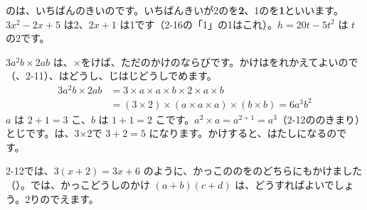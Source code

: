 のは、いちばんのきいのです。いちばんきいが2のを\textbf{2}、1のを\textbf{1}といいます。$3x^2-2x+5$ は2、$2x+1$ は1です（2-16の「1」の1はこれ）。$h=20t-5t^2$ は $t$ の2です。

$3a^2b\times2ab$ は、×をけば、ただのかけのならびです。かけはをれかえてよいので（、2-11）、はどうし、じはじどうしでめます。
\begin{align*}
3a^2b\times2ab&=3\times a\times a\times b\times2\times a\times b\\
&=(3\times2)\times(a\times a\times a)\times(b\times b)=6a^3b^2
\end{align*}
$a$ は $2+1=3$ こ、$b$ は $1+1=2$ こです。$a^2\times a=a^{2+1}=a^3$（2-12ののきまり）とじです。は、3×2で $3+2=5$ になります。かけすると、はたしになるのです。


\leavevmode\label{bk:3-8:kumiawase}2-12では、$3(x+2)=3x+6$ のように、かっこののをのどちらにもかけました（）。では、かっこどうしのかけ $(a+b)(c+d)$ は、どうすればよいでしょう。2りのでえます。

